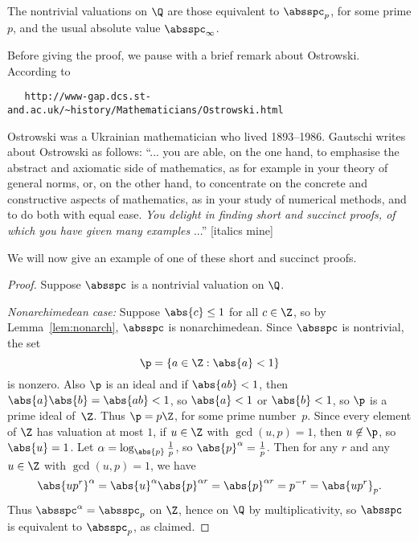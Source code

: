 \documentclass[11pt]{book}
\begin{document}
\begin{ch}
\begin{theorem}[Ostrowski]\label{thm:ostrowski}
The nontrivial valuations
on $\Q$ are those equivalent to $\absspc_p$, for some
prime $p$, and the usual absolute value $\absspc_\infty$.
\end{theorem}
\begin{remark}
Before giving the proof, we pause with a brief remark about
Ostrowski.  According to
\begin{verbatim}
   http://www-gap.dcs.st-and.ac.uk/~history/Mathematicians/Ostrowski.html
\end{verbatim}
\noindent{}Ostrowski was a Ukrainian mathematician who lived
1893--1986.  Gautschi writes about Ostrowski as follows: ``... you are
able, on the one hand, to emphasise the abstract and axiomatic side of
mathematics, as for example in your theory of general norms, or, on
the other hand, to concentrate on the concrete and constructive
aspects of mathematics, as in your study of numerical methods, and to
do both with equal ease. {\em You delight in finding short and
succinct proofs, of which you have given many examples} ...'' [italics mine]
\end{remark}
We will now give an example of one of these short and succinct proofs.
\begin{proof}
Suppose $\absspc$ is a nontrivial valuation on $\Q$.
\par{\em Nonarchimedean case:}
Suppose $\abs{c}\leq 1$ for all $c\in\Z$, so by
Lemma~\ref{lem:nonarch}, $\absspc$ is nonarchimedean.
Since $\absspc$ is nontrivial, the set
$$
  \p=\{a\in\Z : \abs{a}<1\}
$$
is nonzero.  Also $\p$ is an ideal and if $\abs{ab}<1$,
then $\abs{a}\abs{b}=\abs{ab}<1$, so $\abs{a}<1$ or $\abs{b}<1$,
so $\p$ is a prime ideal of~$\Z$.  Thus $\p=p\Z$, for some prime
number~$p$.  Since every element of $\Z$ has valuation at most
$1$, if  $u\in\Z$ with $\gcd(u,p)=1$, then $u\not\in\p$,
so $\abs{u}=1$.  Let $\alpha=\log_{\abs{p}}\frac{1}{p}$, so
$\abs{p}^\alpha = \frac{1}{p}$.    Then for any $r$ and any $u\in\Z$
with $\gcd(u,p)=1$, we have
$$
\abs{up^r}^{\alpha} = \abs{u}^{\alpha}\abs{p}^{\alpha r}
   = \abs{p}^{\alpha r} = p^{-r} = \abs{up^r}_p.
$$
Thus $\absspc^{\alpha} =  \absspc_p$ on $\Z$, hence on $\Q$
by multiplicativity, so $\absspc$ is equivalent to $\absspc_p$,
as claimed.


\end{proof}
\end{ch}
\end{document}
